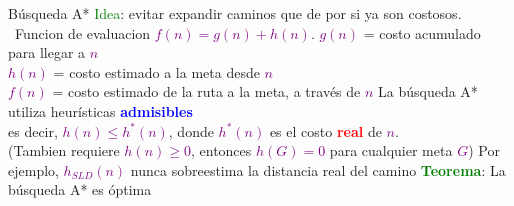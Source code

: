 
    \begin{frame}{Búsqueda A*}
        \small{
            \textcolor{Green}{Idea}: evitar expandir caminos que de por si ya son costosos.
            \break\break\
            Funcion de evaluacion \textcolor{Purple}{$f(n)=g(n)+h(n)$}.
            \break\break
            \textcolor{Purple}{$g(n)$} = costo acumulado para llegar a \textcolor{Purple}{$n$} \\
            \textcolor{Purple}{$h(n)$} = costo estimado a la meta desde \textcolor{Purple}{$n$} \\
            \textcolor{Purple}{$f(n)$} = costo estimado de la ruta a la meta, a través de      \textcolor{Purple}{$n$} 
            \break\break
            La búsqueda A* utiliza heurísticas \textbf{\textcolor{Blue}{admisibles}}\\
            es decir, \textcolor{Purple}{$h(n) \leq h^*(n)$}, donde \textcolor{Purple}{$h^*(n)$} es el costo \textbf{\textcolor{Red}{real}} de \textcolor{Purple}{$n$}.\\
            (Tambien requiere \textcolor{Purple}{$h(n) \geq 0$}, entonces \textcolor{Purple}{$h(G)=0$} para cualquier meta \textcolor{Purple}{$G$})
            \break\break
            Por ejemplo, \textcolor{Purple}{$h_{SLD}(n)$} nunca sobreestima la distancia real del camino
            \break\break
            \textbf{\textcolor{Green}{Teorema}}: La búsqueda A* es óptima
        }\break\break\break
    \end{frame}

